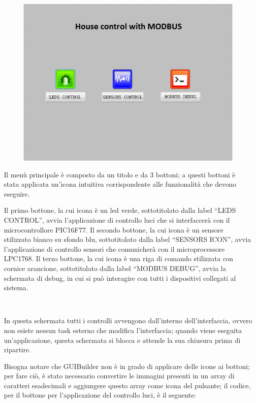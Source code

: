 \documentclass[a4paper,titlepage]{book}
\begin{document}
\begin{figure}[!h]
\centering
\includegraphics[scale=0.6]{menu.jpg}
\end{figure}

Il menù principale è composto da un titolo e da 3 bottoni; a questi bottoni è stata applicata un'icona intuitiva corrispondente alle funzionalità che devono eseguire.

Il primo bottone, la cui icona è un led verde, sottotitolato dalla label ``LEDS CONTROL'', avvia l'applicazione di controllo luci che si interfaccerà con il microcontrollore PIC16F77. Il secondo bottone, la cui icona è un sensore stilizzato bianco su sfondo blu, sottotitolato dalla label ``SENSORS ICON'', avvia l'applicazione di controllo sensori che comunicherà con il microprocessore LPC1768. Il terzo bottone, la cui icona è una riga di comando stilizzata con cornice arancione, sottotitolato dalla label ``MODBUS DEBUG'', avvia la schermata di debug, in cui si può interagire con tutti i dispositivi collegati al sistema.

~

In questa schermata tutti i controlli avvengono dall'interno dell'interfaccia, ovvero non esiste nessun task esterno che modifica l'interfaccia; quando viene eseguita un'applicazione, questa schermata si blocca e attende la sua chiusura prima di ripartire.

Bisogna notare che GUIBuilder non è in grado di applicare delle icone ai bottoni; per fare ciò, è stato necessario convertire le immagini presenti in un array di caratteri esadecimali e aggiungere questo array come icona del pulsante; il codice, per il bottone per l'applicazione del controllo luci, è il seguente:
\end{document}
